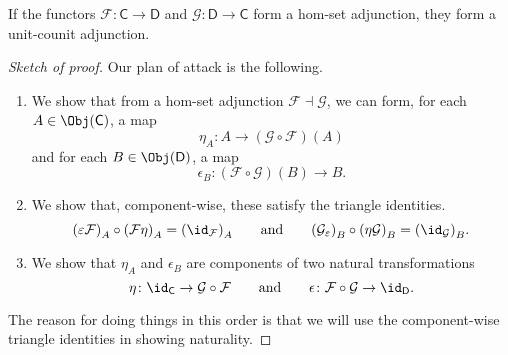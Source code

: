 \documentclass[notes.tex]{subfiles}
\begin{document}
\begin{lemma}
  \label{lemma:hom-set_adjunction_implies_unit-counit_adjunction}
  If the functors $\mathcal{F}\colon \mathsf{C} \to \mathsf{D}$ and $\mathcal{G}\colon \mathsf{D} \to \mathsf{C}$ form a hom-set adjunction, they form a unit-counit adjunction.
\end{lemma}
\begin{proof}[Sketch of proof]
  Our plan of attack is the following.
  \begin{enumerate}
    \item We show that from a hom-set adjunction $\mathcal{F} \dashv \mathcal{G}$, we can form, for each $A \in \Obj(\mathsf{C})$, a map
      \begin{equation*}
        \eta_{A}\colon A \to (\mathcal{G} \circ \mathcal{F})(A)
      \end{equation*}
      and for each $B \in \Obj(\mathsf{D})$, a map
      \begin{equation*}
        \epsilon_{B}\colon (\mathcal{F} \circ \mathcal{G})(B) \to B.
      \end{equation*}

    \item We show that, component-wise, these satisfy the triangle identities.
      \begin{equation*}
        {(\varepsilon\mathcal{F})}_{A} \circ {(\mathcal{F}\eta)}_{A} = {(\id_{\mathcal{F}})}_{A}\qquad\text{and}\qquad {(\mathcal{G}_{\varepsilon})}_{B} \circ {(\eta\mathcal{G})}_{B} = {(\id_{\mathcal{G}})}_{B}.
      \end{equation*}

    \item We show that $\eta_{A}$ and $\epsilon_{B}$ are components of two natural transformations
      \begin{equation*}
        \eta\colon \id_{\mathsf{C}} \to \mathcal{G} \circ \mathcal{F} \qquad \text{and}\qquad \epsilon\colon \mathcal{F} \circ \mathcal{G} \to \id_{\mathsf{D}}.
      \end{equation*}
  \end{enumerate}
  The reason for doing things in this order is that we will use the component-wise triangle identities in showing naturality.
\end{proof}
\end{document}
